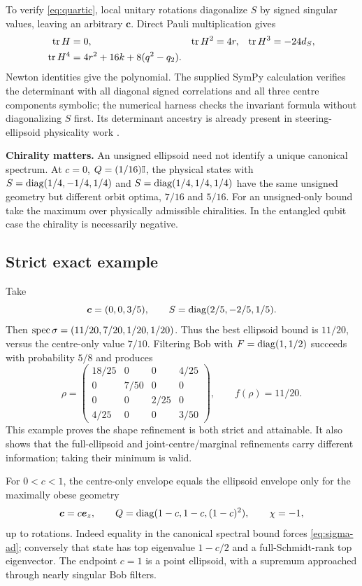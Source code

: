 To verify \eqref{eq:quartic}, local unitary rotations diagonalize $S$ by signed singular values, leaving an arbitrary $\bm c$. Direct Pauli multiplication gives
\begin{align*}
 \operatorname{tr} H&=0,&\operatorname{tr} H^2&=4r,&\operatorname{tr} H^3&=-24d_S,\\
 \operatorname{tr} H^4&=4r^2+16k+8(q^2-q_2).
\end{align*}
Newton identities give the polynomial. The supplied SymPy calculation verifies the determinant with all diagonal signed correlations and all three centre components symbolic; the numerical harness checks the invariant formula without diagonalizing $S$ first. Its determinant ancestry is already present in steering-ellipsoid physicality work \cite{milnegeometry}.

\textbf{Chirality matters.} An unsigned ellipsoid need not identify a unique canonical spectrum. At $c=0$, $Q=(1/16)\mathbb I$, the physical states with $S=\operatorname{diag}(1/4,-1/4,1/4)$ and $S=\operatorname{diag}(1/4,1/4,1/4)$ have the same unsigned geometry but different orbit optima, $7/16$ and $5/16$. For an unsigned-only bound take the maximum over physically admissible chiralities. In the entangled qubit case the chirality is necessarily negative.

\subsection{Strict exact example}
Take
\[
 \bm c=(0,0,3/5),\qquad S=\operatorname{diag}(2/5,-2/5,1/5).
\]
Then $\operatorname{spec}\sigma=(11/20,7/20,1/20,1/20)$. Thus the best ellipsoid bound is $11/20$, versus the centre-only value $7/10$. Filtering Bob with $F=\operatorname{diag}(1,1/2)$ succeeds with probability $5/8$ and produces
\[
 \rho=\begin{pmatrix}
 18/25&0&0&4/25\\
 0&7/50&0&0\\
 0&0&2/25&0\\
 4/25&0&0&3/50
 \end{pmatrix},\qquad f(\rho)=11/20.
\]
This example proves the shape refinement is both strict and attainable. It also shows that the full-ellipsoid and joint-centre/marginal refinements carry different information; taking their minimum is valid.

For $0<c<1$, the centre-only envelope equals the ellipsoid envelope only for the maximally obese geometry
\[
 \bm c=c\bm e_z,\qquad Q=\operatorname{diag}(1-c,1-c,(1-c)^2),\qquad\chi=-1,
\]
up to rotations. Indeed equality in the canonical spectral bound forces \eqref{eq:sigma-ad}; conversely that state has top eigenvalue $1-c/2$ and a full-Schmidt-rank top eigenvector. The endpoint $c=1$ is a point ellipsoid, with a supremum approached through nearly singular Bob filters.

